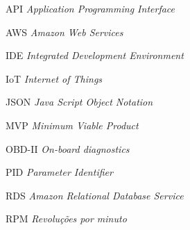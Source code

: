 
\begin{basedescript}{\desclabelstyle{\pushlabel}\desclabelwidth{6em}}
\item[{API}] \textit{Application Programming Interface}
\item[{AWS}] \textit{Amazon Web Services}
\item[{IDE}] \textit{Integrated Development Environment}
\item[{IoT}] \textit{Internet of Things}
\item[{JSON}] \textit{Java Script Object Notation}
\item[{MVP}] \textit{Minimum Viable Product}
\item[{OBD-II}] \textit{On-board diagnostics}
\item[{PID}] \textit{Parameter Identifier}
\item[{RDS}] \textit{Amazon Relational Database Service}
\item[{RPM}] \textit{Revoluções por minuto}

\end{basedescript}